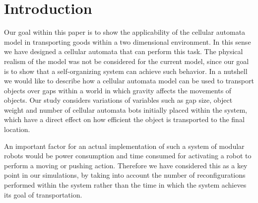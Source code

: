 \section{Introduction}
\label{sec:intro}

Our goal within this paper is to show the applicability of the cellular automata model in transporting goods within a two dimensional environment. In this sense we have designed a cellular automata that can perform this task. The physical realism of the model was not be considered for the current model, since our goal is to show that a self-organizing system can achieve such behavior. In a nutshell we would like to describe how a cellular automata model can be used to transport objects over gaps within a world in which gravity affects the movements of objects. Our study considers variations of variables such as gap size, object weight and number of cellular automata bots initially placed within the system, which have a direct effect on how efficient the object is transported to the final location. 

An important factor for an actual implementation of such a system of modular robots would be power consumption and time consumed for activating a robot to perform a moving or pushing action. Therefore we have considered this as a key point in our simulations, by taking into account the number of reconfigurations performed within the system rather than the time in which the system achieves its goal of transportation. 

\clearpage
